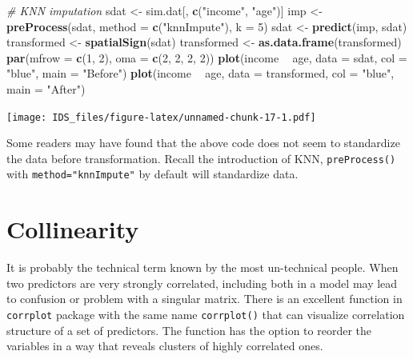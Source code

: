\documentclass[12pt,]{krantz}
\makeatletter
\newenvironment{Shaded}{\begin{snugshade}}{\end{snugshade}}
\newcommand{\CommentTok}[1]{\textcolor[rgb]{0.37,0.37,0.37}{\textit{#1}}}
\newcommand{\DataTypeTok}[1]{\textcolor[rgb]{0.27,0.27,0.27}{#1}}
\newcommand{\DecValTok}[1]{\textcolor[rgb]{0.06,0.06,0.06}{#1}}
\newcommand{\KeywordTok}[1]{\textcolor[rgb]{0.27,0.27,0.27}{\textbf{#1}}}
\newcommand{\NormalTok}[1]{#1}
\newcommand{\OperatorTok}[1]{\textcolor[rgb]{0.43,0.43,0.43}{\textbf{#1}}}
\newcommand{\StringTok}[1]{\textcolor[rgb]{0.5,0.5,0.5}{#1}}
\newenvironment{kframe}{%
\medskip{}
\setlength{\fboxsep}{.8em}
 \def\at@end@of@kframe{}%
 \ifinner\ifhmode%
  \def\at@end@of@kframe{\end{minipage}}%
  \begin{minipage}{\columnwidth}%
 \fi\fi%
 \def\FrameCommand##1{\hskip\@totalleftmargin \hskip-\fboxsep
 \colorbox{shadecolor}{##1}\hskip-\fboxsep
     \hskip-\linewidth \hskip-\@totalleftmargin \hskip\columnwidth}%
 \MakeFramed {\advance\hsize-\width
   \@totalleftmargin\z@ \linewidth\hsize
   \@setminipage}}%
 {\par\unskip\endMakeFramed%
 \at@end@of@kframe}
\renewenvironment{Shaded}{\begin{kframe}}{\end{kframe}}
\makeatother
\begin{document}
\begin{Shaded}
\begin{Highlighting}[]
\CommentTok{# KNN imputation}
\NormalTok{sdat <-}\StringTok{ }\NormalTok{sim.dat[, }\KeywordTok{c}\NormalTok{(}\StringTok{"income"}\NormalTok{, }\StringTok{"age"}\NormalTok{)]}
\NormalTok{imp <-}\StringTok{ }\KeywordTok{preProcess}\NormalTok{(sdat, }\DataTypeTok{method =} \KeywordTok{c}\NormalTok{(}\StringTok{"knnImpute"}\NormalTok{), }\DataTypeTok{k =} \DecValTok{5}\NormalTok{)}
\NormalTok{sdat <-}\StringTok{ }\KeywordTok{predict}\NormalTok{(imp, sdat)}
\NormalTok{transformed <-}\StringTok{ }\KeywordTok{spatialSign}\NormalTok{(sdat)}
\NormalTok{transformed <-}\StringTok{ }\KeywordTok{as.data.frame}\NormalTok{(transformed)}
\KeywordTok{par}\NormalTok{(}\DataTypeTok{mfrow =} \KeywordTok{c}\NormalTok{(}\DecValTok{1}\NormalTok{, }\DecValTok{2}\NormalTok{), }\DataTypeTok{oma =} \KeywordTok{c}\NormalTok{(}\DecValTok{2}\NormalTok{, }\DecValTok{2}\NormalTok{, }\DecValTok{2}\NormalTok{, }\DecValTok{2}\NormalTok{))}
\KeywordTok{plot}\NormalTok{(income }\OperatorTok{~}\StringTok{ }\NormalTok{age, }\DataTypeTok{data =}\NormalTok{ sdat, }\DataTypeTok{col =} \StringTok{"blue"}\NormalTok{, }\DataTypeTok{main =} \StringTok{"Before"}\NormalTok{)}
\KeywordTok{plot}\NormalTok{(income }\OperatorTok{~}\StringTok{ }\NormalTok{age, }\DataTypeTok{data =}\NormalTok{ transformed, }\DataTypeTok{col =} \StringTok{"blue"}\NormalTok{, }\DataTypeTok{main =} \StringTok{"After"}\NormalTok{)}
\end{Highlighting}
\end{Shaded}

\texttt{[image: IDS\_files/figure-latex/unnamed-chunk-17-1.pdf]}

Some readers may have found that the above code does not seem to standardize the data before transformation. Recall the introduction of KNN, \texttt{preProcess()} with \texttt{method="knnImpute"} by default will standardize data.

\hypertarget{collinearity}{%
\section{Collinearity}\label{collinearity}}

It is probably the technical term known by the most un-technical people. When two predictors are very strongly correlated, including both in a model may lead to confusion or problem with a singular matrix. There is an excellent function in \texttt{corrplot} package with the same name \texttt{corrplot()} that can visualize correlation structure of a set of predictors. The function has the option to reorder the variables in a way that reveals clusters of highly correlated ones.
\end{document}
